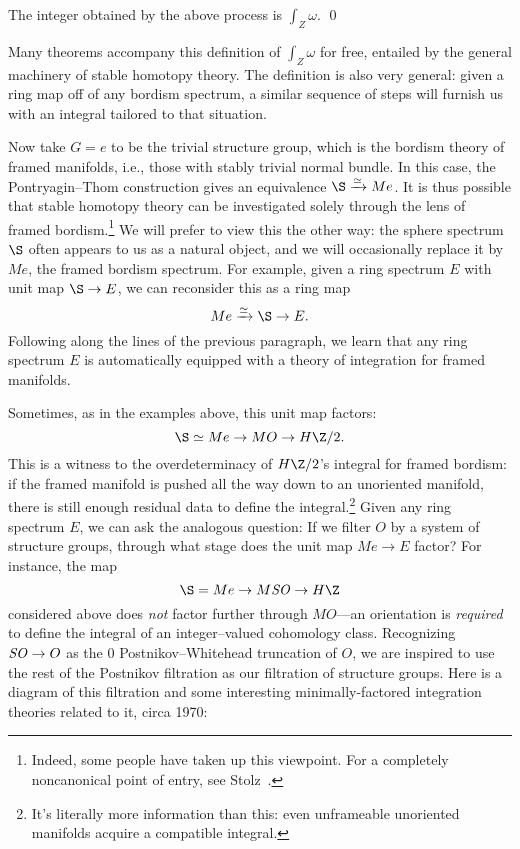 \begin{lemma}%
The integer obtained by the above process is $\int_Z \omega$. \qed
\end{lemma}

\noindent Many theorems accompany this definition of $\int_Z \omega$ for free, entailed by the general machinery of stable homotopy theory.  The definition is also very general: given a ring map off of any bordism spectrum, a similar sequence of steps will furnish us with an integral tailored to that situation.

Now take $G = e$ to be the trivial structure group, which is the bordism theory of framed manifolds, i.e., those with stably trivial normal bundle.  In this case, the Pontryagin--Thom construction gives an equivalence $\S \xrightarrow{\simeq} Me$.  It is thus possible that stable homotopy theory can be investigated solely through the lens of framed bordism.\footnote{Indeed, some people have taken up this viewpoint.  For a completely noncanonical point of entry, see Stolz~\cite{Stolz}.}  We will prefer to view this the other way: the sphere spectrum $\S$ often appears to us as a natural object, and we will occasionally replace it by $Me$, the framed bordism spectrum.  For example, given a ring spectrum $E$ with unit map $\S \to E$, we can reconsider this as a ring map \[Me \xrightarrow{\simeq} \S \to E.\]  Following along the lines of the previous paragraph, we learn that any ring spectrum $E$ is automatically equipped with a theory of integration for framed manifolds.

Sometimes, as in the examples above, this unit map factors: \[\S \simeq Me \to MO \to H\Z/2.\]  This is a witness to the overdeterminacy of $H\Z/2$'s integral for framed bordism: if the framed manifold is pushed all the way down to an unoriented manifold, there is still enough residual data to define the integral.\footnote{It's literally more information than this: even unframeable unoriented manifolds acquire a compatible integral.}  Given any ring spectrum $E$, we can ask the analogous question: If we filter $O$ by a system of structure groups, through what stage does the unit map $Me \to E$ factor?  For instance, the map \[\S = Me \to M\SO \to H\Z\] considered above does \emph{not} factor further through $MO$---an orientation is \emph{required} to define the integral of an integer--valued cohomology class.  Recognizing $\mathit{SO} \to O$ as the $0${\th} Postnikov--Whitehead truncation of $O$, we are inspired to use the rest of the Postnikov filtration as our filtration of structure groups.  Here is a diagram of this filtration and some interesting minimally-factored integration theories related to it, circa 1970:
\begin{center}
\end{center}

